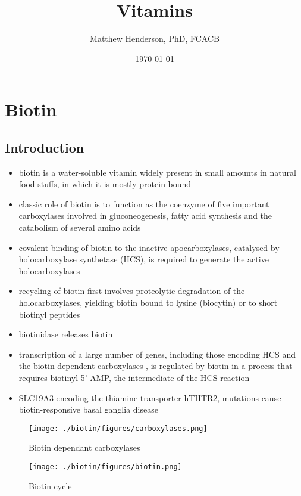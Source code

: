 \documentclass{scrartcl}
\author{Matthew Henderson, PhD, FCACB}
\date{\today}
\title{Vitamins}
\begin{document}
\maketitle
\setcounter{tocdepth}{2}
\tableofcontents


\section{Biotin}
\label{sec:org9a5ddc4}
\subsection{Introduction}
\label{sec:orgcf2fc76}
\begin{itemize}
\item biotin is a water-soluble vitamin widely present in small amounts in
natural food-stuffs, in which it is mostly protein bound
\item classic role of biotin is to function as the coenzyme of five
important carboxylases involved in gluconeogenesis, fatty acid
synthesis and the catabolism of several amino acids
\item covalent binding of biotin to the inactive apocarboxylases,
catalysed by holocarboxylase synthetase (HCS), is required to
generate the active holocarboxylases
\item recycling of biotin first involves proteolytic degradation of the
holocarboxylases, yielding biotin bound to lysine (biocytin) or to
short biotinyl peptides
\item biotinidase releases biotin
\item transcription of a large number of genes, including those encoding
HCS and the biotin-dependent carboxylases , is regulated by biotin
in a process that requires biotinyl-5’-AMP, the intermediate of the
HCS reaction
\item SLC19A3 encoding the thiamine transporter hTHTR2, mutations cause
biotin-responsive basal ganglia disease
\end{itemize}

\begin{figure}[htbp]
\centering
\texttt{[image: ./biotin/figures/carboxylases.png]}
\caption{\label{fig:org37019d5}
Biotin dependant carboxylases}
\end{figure}


\begin{figure}[htbp]
\centering
\texttt{[image: ./biotin/figures/biotin.png]}
\caption{\label{fig:org26b879b}
Biotin cycle}
\end{figure}
\end{document}
